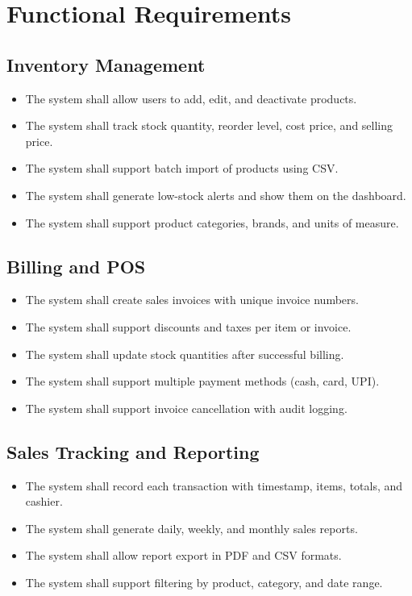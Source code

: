 \section{Functional Requirements}
\subsection{Inventory Management}
\begin{itemize}
    \item The system shall allow users to add, edit, and deactivate products.
    \item The system shall track stock quantity, reorder level, cost price, and selling price.
    \item The system shall support batch import of products using CSV.
    \item The system shall generate low-stock alerts and show them on the dashboard.
    \item The system shall support product categories, brands, and units of measure.
\end{itemize}

\subsection{Billing and POS}
\begin{itemize}
    \item The system shall create sales invoices with unique invoice numbers.
    \item The system shall support discounts and taxes per item or invoice.
    \item The system shall update stock quantities after successful billing.
    \item The system shall support multiple payment methods (cash, card, UPI).
    \item The system shall support invoice cancellation with audit logging.
\end{itemize}

\subsection{Sales Tracking and Reporting}
\begin{itemize}
    \item The system shall record each transaction with timestamp, items, totals, and cashier.
    \item The system shall generate daily, weekly, and monthly sales reports.
    \item The system shall allow report export in PDF and CSV formats.
    \item The system shall support filtering by product, category, and date range.
\end{itemize}

